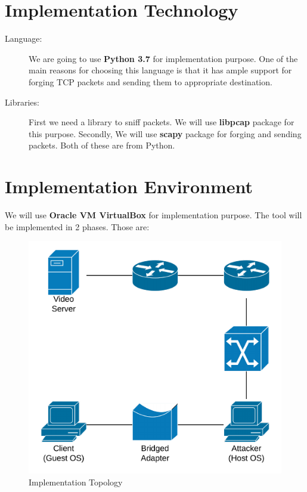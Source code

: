 \documentclass[14pt]{extarticle}
\begin{document}
\section{Implementation Technology}
    \begin{description}
    
    \item[Language:] We are going to use \textbf{Python 3.7} for implementation purpose. One of the main reasons for choosing this language is that it has ample support for forging TCP packets and sending them to appropriate destination. 
    
    \item[Libraries:] First we need a library to sniff packets. We will use \textbf{libpcap} package for this purpose. Secondly, We will use \textbf{scapy} package for forging and sending packets. Both of these are from Python.
    
    \end{description}



\section{Implementation Environment}
    
    We will use \textbf{Oracle VM VirtualBox}  for implementation purpose. The tool will be implemented in 2 phases. Those are: 
    
    \begin{figure}
        \centering
        \includegraphics[width=.75\textwidth]{Pictures/TCP_RST_Topology_Implementation.png}
        \caption{Implementation Topology}
        \label{fig:topolgy_implement}
    \end{figure}
    
\end{document}
